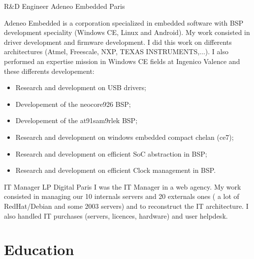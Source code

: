 \documentclass[11pt,a4paper,sans]{moderncv}
\begin{document}
{R\&D Engineer}
{Adeneo Embedded}
{Paris}
{}
{Adeneo Embedded is a corporation specialized in embedded software with BSP
development speciality (Windows CE, Linux and Android).
My work consisted in driver development and firmware development.
I did this work on differents architectures (Atmel, Freescale,
NXP, TEXAS INSTRUMENTS,...).
I also performed an expertise mission in Windows CE fields at Ingenico
Valence and these differents developement:
\begin{itemize}
\item Research and development on USB drivers;
\item Developement of the neocore926 BSP;
\item Developement of the at91sam9rlek BSP;
\item Research and development on windows embedded compact chelan (ce7);
\item Research and development on efficient SoC abstraction in BSP;
\item Research and development on efficient Clock management in BSP.
\end{itemize}
}

{IT Manager}
{LP Digital}
{Paris}
{}
{I was the IT Manager in a web agency.\newline{}
My work consisted in managing our 10 internals servers and 20 externals ones
( a lot of RedHat/Debian and some 2003 servers) and to reconstruct the IT
architecture.
I also handled IT purchases (servers, licences, hardware) and user helpdesk.
}

\section{Education}
\end{document}
